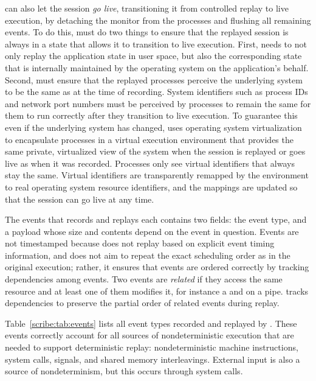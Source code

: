 \scribe{} can also let the session {\em go live}, transitioning it
from controlled replay to live execution, by detaching the monitor
from the processes and flushing all remaining events.  To do this,
\scribe{} must do two things to ensure that the replayed session
is always in a state that allows it to transition to live execution.
First, \scribe{} needs to not only replay the application state in
user space, but also the corresponding state that is internally
maintained by the operating system on the application's behalf.
Second, \scribe{} must ensure that the replayed processes perceive the
underlying system to be the same as at the time of recording.  
System identifiers such as process IDs and network port numbers must
be perceived by processes to remain the same for them to run correctly
after they transition to live execution.  To guarantee this
even if the underlying system has changed, \scribe{} uses operating
system virtualization~\cite{zap02} to encapsulate processes in a
virtual execution environment that provides the same private,
virtualized view of the system when the session is replayed or goes
live as when it was recorded.  Processes only see virtual identifiers
that always stay the same.  Virtual identifiers are transparently
remapped by the environment to real operating system resource
identifiers, and the mappings are updated so that the session can go
live at any time.

The events that \scribe{} records and replays each contains two fields:
the event type, and a payload whose size and contents depend
on the event in question.  Events are not timestamped
because \scribe{} does not replay based on explicit event timing
information, and does not aim to repeat the exact scheduling
order as in the original execution; rather, it ensures that events are
ordered correctly by tracking dependencies among events.  Two events
are {\em related} if they access the same resource and at least one of
them modifies it, for instance a  and  on a
pipe.  \scribe{} tracks dependencies to preserve the partial order of
related events during replay.  

Table~\ref{scribe:tab:events} lists all
event types recorded and replayed by \scribe{}.  These events
correctly account for all sources of nondeterministic execution that
are needed to support deterministic replay: nondeterministic machine
instructions, system calls, signals, and shared memory interleavings.
External input is also a source of nondeterminism, but this occurs
through system calls.

